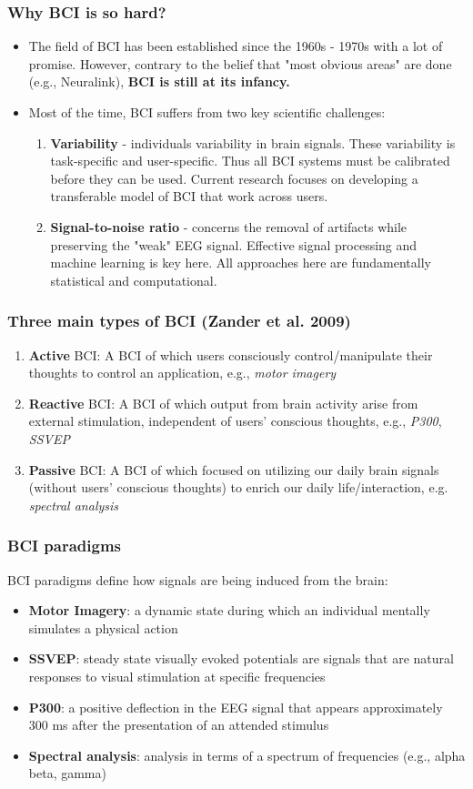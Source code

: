 \documentclass{beamer}
\begin{document}
\begin{frame}
\frametitle{Why BCI is so hard?} 
\begin{itemize}
	\item The field of BCI has been established since the 1960s - 1970s with a lot of promise.  However, contrary to the belief that "most obvious areas" are done (e.g., Neuralink), \textbf{BCI is still at its infancy.} 
	\item Most of the time,  BCI suffers from two key scientific challenges:
	\begin{enumerate}
		\item \textbf{Variability} - individuals variability in brain signals.  These variability is task-specific and user-specific.  Thus all BCI systems must be calibrated before they can be used.  Current research focuses on developing a transferable model of BCI that work across users.
		\item \textbf{Signal-to-noise ratio} - concerns the removal of artifacts while preserving the "weak" EEG signal.  Effective signal processing and machine learning is key here.  All approaches here are fundamentally statistical and computational.
	\end{enumerate}	 
\end{itemize}
\end{frame}

\begin{frame}
\frametitle{Three main types of BCI (Zander et al. 2009)} 
	\begin{enumerate}
		\item \textbf{Active} BCI:  A BCI of which users consciously control/manipulate their thoughts to control an application, e.g., \textit{motor imagery}
		\item \textbf{Reactive} BCI: A BCI of which output from brain activity arise from external stimulation, independent of users' conscious thoughts, e.g., \textit{P300}, \textit{SSVEP}
		\item \textbf{Passive} BCI: A BCI of which focused on utilizing our daily brain signals (without users' conscious thoughts) to enrich our daily life/interaction,  e.g. \textit{spectral analysis}
	\end{enumerate}	 
\end{frame}

\begin{frame}
\frametitle{BCI paradigms} 
BCI paradigms define how signals are being induced from the brain:
	\begin{itemize}
	\item \textbf{Motor Imagery}:  a dynamic state during which an individual mentally simulates a physical action
	\item \textbf{SSVEP}: steady state visually evoked potentials are signals that are natural responses to visual stimulation at specific frequencies
	\item \textbf{P300}: a positive deflection in the EEG signal that appears approximately 300 ms after the presentation of an attended stimulus
	\item \textbf{Spectral analysis}: analysis in terms of a spectrum of frequencies (e.g., alpha beta, gamma)
	\end{itemize}
\end{frame}
\end{document}
